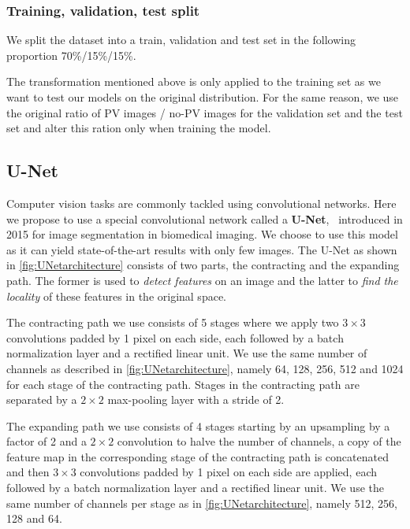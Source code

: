 \documentclass[10pt,conference]{IEEEtran}
\begin{document}
\subsubsection{Training, validation, test split}
We split the dataset into a train, validation and test set in the following proportion 70\%/15\%/15\%.

The transformation mentioned above is only applied to the training set as we want to test our models on the original distribution. For the same reason, we use the original ratio of PV images / no-PV images for the validation set and the test set and alter this ration only when training the model.

\subsection{U-Net}
Computer vision tasks are commonly tackled using convolutional networks. 
Here we propose to use a special convolutional network called a \textbf{U-Net},~\cite{ronneberger2015unet}
introduced in 2015 for image segmentation in biomedical imaging.
We choose to use this model as it can yield state-of-the-art results with only few images.
The U-Net as shown in \autoref{fig:UNetarchitecture} consists of two parts,
the contracting and the expanding path.
The former is used to \textit{detect features} on an image
and the latter to \textit{find the locality} of these features in the original space.

The contracting path we use consists of 5 stages where we apply two $3 \times 3$ convolutions padded by 1 pixel on each side,
each followed by a batch normalization layer and a rectified linear unit.
We use the same number of channels as described in \autoref{fig:UNetarchitecture}, namely 64, 128, 256, 512 and 1024 for each stage of the contracting path. 
Stages in the contracting path are separated by a $2 \times 2$ max-pooling layer with a stride of 2. 

The expanding path we use consists of 4 stages starting by an upsampling by a factor of 2 and a $2 \times 2$ convolution to halve the number of channels,
a copy of the feature map in the corresponding stage of the contracting path is concatenated and then $3 \times 3$ convolutions padded by 1 pixel on each side are applied,
each followed by a batch normalization layer and a rectified linear unit.
We use the same number of channels per stage as in \autoref{fig:UNetarchitecture}, namely 512, 256, 128 and 64.
\end{document}
